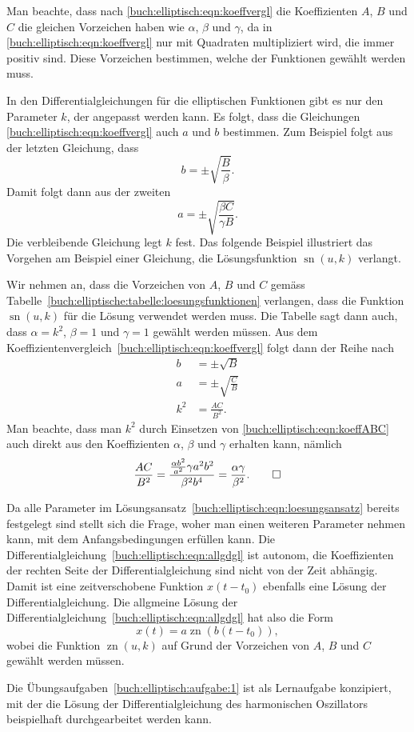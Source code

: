Man beachte, dass nach \eqref{buch:elliptisch:eqn:koeffvergl} die 
Koeffizienten $A$, $B$ und $C$ die gleichen Vorzeichen haben wie
$\alpha$, $\beta$ und $\gamma$, da in 
\eqref{buch:elliptisch:eqn:koeffvergl} nur mit Quadraten multipliziert
wird, die immer positiv sind.
Diese Vorzeichen bestimmen, welche der Funktionen gewählt werden muss.

In den Differentialgleichungen für die elliptischen Funktionen gibt
es nur den Parameter $k$, der angepasst werden kann.
Es folgt, dass die Gleichungen
\eqref{buch:elliptisch:eqn:koeffvergl} 
auch $a$ und $b$ bestimmen.
Zum Beispiel folgt aus der letzten Gleichung, dass
\[
b = \pm\sqrt{\frac{B}{\beta}}.
\]
Damit folgt dann aus der zweiten
\[
a=\pm\sqrt{\frac{\beta C}{\gamma B}}.
\]
Die verbleibende Gleichung legt $k$ fest.
Das folgende Beispiel illustriert das Vorgehen am Beispiel einer
Gleichung, die Lösungsfunktion $\operatorname{sn}(u,k)$ verlangt.

\begin{beispiel}
Wir nehmen an, dass die Vorzeichen von $A$, $B$ und $C$ gemäss
Tabelle~\ref{buch:elliptische:tabelle:loesungsfunktionen} verlangen,
dass die Funktion $\operatorname{sn}(u,k)$ für die Lösung verwendet
werden muss.
Die Tabelle sagt dann auch, dass 
$\alpha=k^2$, $\beta=1$ und $\gamma=1$ gewählt werden müssen.
Aus dem Koeffizientenvergleich~\eqref{buch:elliptisch:eqn:koeffvergl}
folgt dann der Reihe nach
\begin{align*}
b&=\pm \sqrt{B}
\\
a&=\pm \sqrt{\frac{C}{B}}
\\
k^2
&=
\frac{AC}{B^2}.
\end{align*}
Man beachte, dass man $k^2$ durch Einsetzen von
\eqref{buch:elliptisch:eqn:koeffABC}
auch direkt aus den Koeffizienten $\alpha$, $\beta$ und $\gamma$
erhalten kann, nämlich
\[
\frac{AC}{B^2}
=
\frac{\frac{\alpha b^2}{a^2} \gamma a^2b^2}{\beta^2 b^4}
=
\frac{\alpha\gamma}{\beta^2}.
\qedhere
\]
\end{beispiel}

Da alle Parameter im 
Lösungsansatz~\eqref{buch:elliptisch:eqn:loesungsansatz} bereits
festgelegt sind stellt sich die Frage, woher man einen weiteren
Parameter nehmen kann, mit dem Anfangsbedingungen erfüllen kann.
Die Differentialgleichung~\eqref{buch:elliptisch:eqn:allgdgl} ist
autonom, die Koeffizienten der rechten Seite der Differentialgleichung
sind nicht von der Zeit abhängig. 
Damit ist eine zeitverschobene Funktion $x(t-t_0)$ ebenfalls eine
Lösung der Differentialgleichung.
Die allgmeine Lösung der 
Differentialgleichung~\eqref{buch:elliptisch:eqn:allgdgl} hat
also die Form
\[
x(t) = a\operatorname{zn}(b(t-t_0)),
\]
wobei die Funktion $\operatorname{zn}(u,k)$ auf Grund der Vorzeichen
von $A$, $B$ und $C$ gewählt werden müssen.

Die Übungsaufgaben~\ref{buch:elliptisch:aufgabe:1} ist als
Lernaufgabe konzipiert, mit der die Lösung der Differentialgleichung
des harmonischen Oszillators beispielhaft durchgearbeitet
werden kann.
